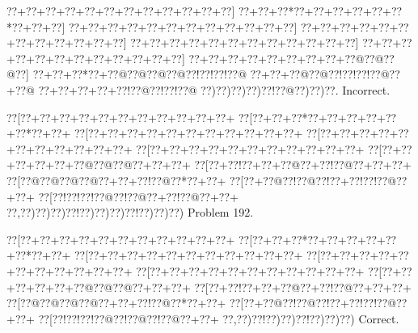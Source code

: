 \documentclass[a5paper]{article}
\begin{document}
\begin{center}
{\goo
\0??+\0??+\0??+\0??+\0??+\0??+\0??+\0??+\0??+\0??+\0??+\0??]
\0??+\0??+\0??*\0??+\0??+\0??+\0??+\0??+\0??*\0??+\0??+\0??]
\0??+\0??+\0??+\0??+\0??+\0??+\0??+\0??+\0??+\0??+\0??+\0??]
\0??+\0??+\0??+\0??+\0??+\0??+\0??+\0??+\0??+\0??+\0??+\0??]
\0??+\0??+\0??+\0??+\0??+\0??+\0??+\0??+\0??+\0??+\0??+\0??]
\0??+\0??+\0??+\0??+\0??+\0??+\0??+\0??+\0??+\0??+\0??+\0??]
\0??+\0??+\0??+\0??+\0??+\0??+\0??+\0??+\0??@\0??@\0??@\0??]
\0??+\0??+\0??*\0??+\0??@\0??@\0??@\0??@\0??!\0??!\0??!\0??@
\0??+\0??+\0??@\0??@\0??!\0??!\0??!\0??@\0??+\0??@
\0??+\0??+\0??+\0??+\0??!\0??@\0??!\0??!\0??@
\0??)\0??)\0??)\0??)\0??!\0??@\0??)\0??)\0??.
}
Incorrect. 

\end{center}
\newpage
\begin{center}
{\goo
\0??[\0??+\0??+\0??+\0??+\0??+\0??+\0??+\0??+\0??+\0??+\0??+
\0??[\0??+\0??+\0??*\0??+\0??+\0??+\0??+\0??+\0??*\0??+\0??+
\0??[\0??+\0??+\0??+\0??+\0??+\0??+\0??+\0??+\0??+\0??+\0??+
\0??[\0??+\0??+\0??+\0??+\0??+\0??+\0??+\0??+\0??+\0??+\0??+
\0??[\0??+\0??+\0??+\0??+\0??+\0??+\0??+\0??+\0??+\0??+\0??+
\0??[\0??+\0??+\0??+\0??+\0??+\0??@\0??@\0??@\0??+\0??+\0??+
\0??[\0??+\0??!\0??+\0??+\0??@\0??+\0??!\0??@\0??+\0??+\0??+
\0??[\0??@\0??@\0??@\0??@\0??+\0??+\0??!\0??@\0??*\0??+\0??+
\0??[\0??+\0??@\0??!\0??@\0??!\0??+\0??!\0??!\0??@\0??+\0??+
\0??[\0??!\0??!\0??!\0??@\0??!\0??@\0??+\0??!\0??@\0??+\0??+
\0??,\0??)\0??)\0??)\0??!\0??)\0??)\0??)\0??!\0??)\0??)\0??)
}
Problem 192.

\end{center}
\begin{center}
{\goo
\0??[\0??+\0??+\0??+\0??+\0??+\0??+\0??+\0??+\0??+\0??+\0??+
\0??[\0??+\0??+\0??*\0??+\0??+\0??+\0??+\0??+\0??*\0??+\0??+
\0??[\0??+\0??+\0??+\0??+\0??+\0??+\0??+\0??+\0??+\0??+\0??+
\0??[\0??+\0??+\0??+\0??+\0??+\0??+\0??+\0??+\0??+\0??+\0??+
\0??[\0??+\0??+\0??+\0??+\0??+\0??+\0??+\0??+\0??+\0??+\0??+
\0??[\0??+\0??+\0??+\0??+\0??+\0??@\0??@\0??@\0??+\0??+\0??+
\0??[\0??+\0??!\0??+\0??+\0??@\0??+\0??!\0??@\0??+\0??+\0??+
\0??[\0??@\0??@\0??@\0??@\0??+\0??+\0??!\0??@\0??*\0??+\0??+
\0??[\0??+\0??@\0??!\0??@\0??!\0??+\0??!\0??!\0??@\0??+\0??+
\0??[\0??!\0??!\0??!\0??@\0??!\0??@\0??!\0??@\0??+\0??+
\0??,\0??)\0??!\0??)\0??)\0??!\0??)\0??)\0??)
}
Correct. 

\end{center}
\end{document}
